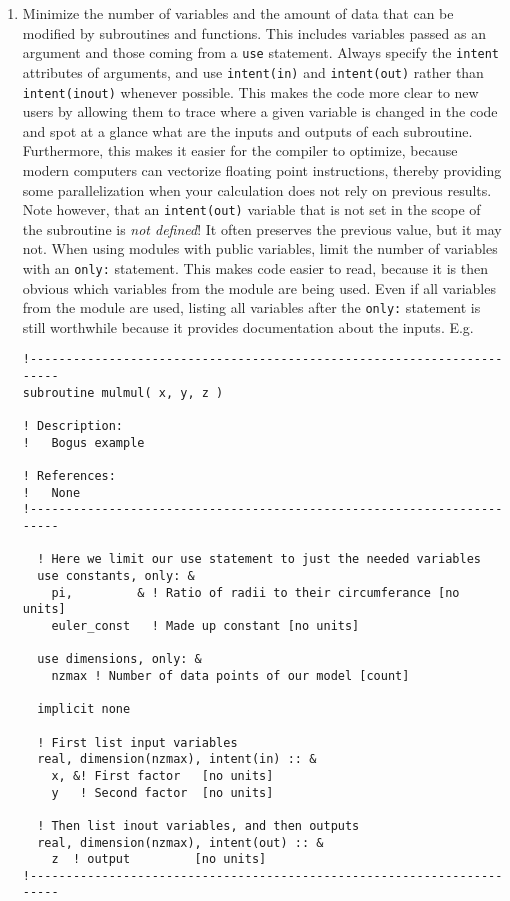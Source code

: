 \documentclass[letterpaper,12pt]{article}
\begin{document}
\begin{enumerate}
\item Minimize the number of variables and the amount of data that can be 
modified by subroutines and functions.  This includes variables passed as an 
argument and those coming from a \texttt{use} statement. 
Always specify the \texttt{intent} attributes of arguments, and 
use \texttt{intent(in)} 
and \texttt{intent(out)} rather than \texttt{intent(inout)} whenever possible.
This makes the code more clear to new users by allowing them to trace where a 
given variable is changed in the code and spot at a glance what are the inputs and
outputs of each subroutine.  Furthermore,
this makes it easier for the compiler to optimize, because modern computers can 
vectorize floating point instructions, thereby providing some 
parallelization when your calculation does not rely on previous results.
Note however, that an \texttt{intent(out)} variable that is not set in the scope of the subroutine
is \emph{not defined}!  It often preserves the previous value, but it may not.
When using modules with public variables, limit 
the number of variables with an \texttt{only:} statement.  This makes code 
easier to read, because it is then obvious which variables from the module 
are being used.  Even if all variables from the module are used, listing
all variables after the \texttt{only:} statement is still worthwhile
because it provides documentation about the inputs. \newline
E.g.
\begin{verbatim}
!-----------------------------------------------------------------------
subroutine mulmul( x, y, z )

! Description:
!   Bogus example

! References:
!   None
!-----------------------------------------------------------------------

  ! Here we limit our use statement to just the needed variables
  use constants, only: &
    pi,         & ! Ratio of radii to their circumferance [no units]
    euler_const   ! Made up constant [no units]

  use dimensions, only: &
    nzmax ! Number of data points of our model [count]

  implicit none

  ! First list input variables
  real, dimension(nzmax), intent(in) :: &
    x, &! First factor   [no units]
    y   ! Second factor  [no units]

  ! Then list inout variables, and then outputs 
  real, dimension(nzmax), intent(out) :: &
    z  ! output         [no units]
!-----------------------------------------------------------------------


\end{verbatim}
\end{enumerate}
\end{document}
